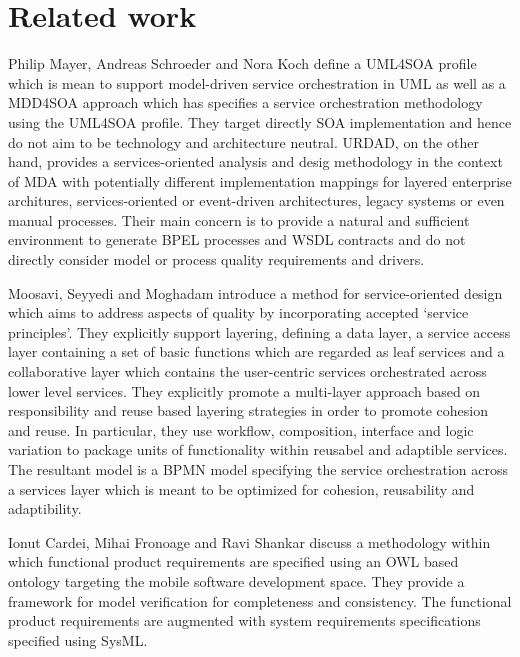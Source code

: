 \section{Related work}
\label{sec:relatedWork}

\cite{chitforoush_methodology_2007}

Philip Mayer, Andreas Schroeder and Nora Koch\cite{mayer_mdd4soa:_2008} define a UML4SOA profile which is mean to support model-driven service orchestration in UML as well as a MDD4SOA approach which has specifies a service orchestration methodology using the UML4SOA profile. They target directly SOA implementation and hence do not aim to be technology and architecture neutral. URDAD, on the other hand, provides a services-oriented analysis and desig methodology in the context of MDA with potentially different implementation mappings for layered enterprise architures, services-oriented or event-driven architectures, legacy systems or even manual processes. Their main concern is to provide a natural and sufficient environment to generate BPEL processes and WSDL contracts and do not directly consider model or process quality requirements and drivers.

Moosavi, Seyyedi and Moghadam\cite{moosavi_method_2009} introduce a method for service-oriented design which aims to address aspects of quality by incorporating accepted `service principles'. They explicitly support layering, defining a data layer, a service access layer containing a set of basic functions which are regarded as leaf services and a collaborative layer which contains the user-centric services orchestrated across lower level services. They explicitly promote a multi-layer approach based on responsibility and reuse based layering strategies in order to promote cohesion and reuse. In particular, they use workflow, composition, interface and logic variation to package units of functionality within reusabel and adaptible services. The resultant model is a BPMN model specifying the service orchestration across a services layer which is meant to be optimized for cohesion, reusability and adaptibility.

Ionut Cardei, Mihai Fronoage and Ravi Shankar\cite{cardei_model_2008} discuss a methodology within which functional product requirements are specified using an OWL based ontology targeting the mobile software development space. They provide a framework for model verification for completeness and consistency. The functional product requirements are augmented with system requirements specifications specified using SysML.

\cite{shim_design_2008}

